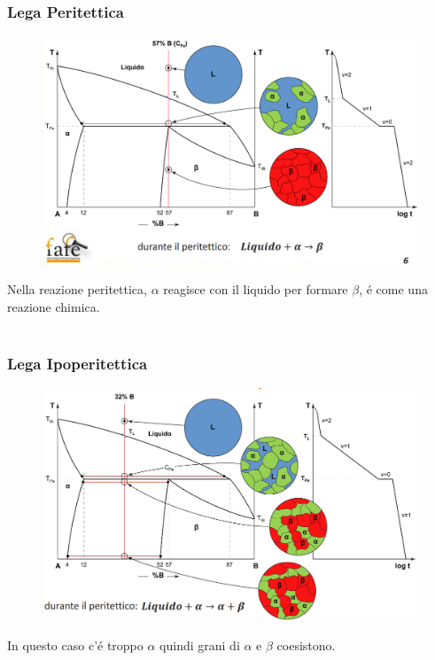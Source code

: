 \documentclass{article}
\begin{document}
{            \subsubsection{Lega Peritettica}
                \begin{figure}[h!]
                    \centering
                    \includegraphics[width=.85\linewidth]{Diagramma di stato e traietoria di raffreddamento per lega peritettica.png}
                \end{figure}
                Nella reazione peritettica, $\alpha$ reagisce con il liquido per formare $\beta$, \'e come una reazione chimica.\\ \\
            \subsubsection{Lega Ipoperitettica}
                \begin{figure}[h!]
                    \centering
                    \includegraphics[width=.85\linewidth]{Diagramma di stato e traietoria di raffreddamento per lega ipoperitettica.png}
                \end{figure}
                In questo caso c'\'e troppo $\alpha$ quindi grani di $\alpha$ e $\beta$ coesistono.\\ \\
}
\end{document}
